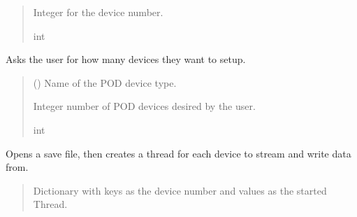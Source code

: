 \documentclass[letterpaper,10pt,english]{sphinxmanual}
\begin{document}
\begin{fulllineitems}
\begin{fulllineitems}
\begin{quote}
\begin{description}
\sphinxAtStartPar
Integer for the device number.

\sphinxAtStartPar
int

\end{description}\end{quote}

\end{fulllineitems}


\begin{fulllineitems}
\label{\detokenize{Setup_PodInterface:Setup_PodInterface.Setup_Interface._SetNumberOfDevices}}
\pysigstartsignatures
{}
\pysigstopsignatures
\sphinxAtStartPar
Asks the user for how many devices they want to setup.
\begin{quote}\begin{description}
\sphinxAtStartPar
{} () \textendash{} Name of the POD device type.

\sphinxAtStartPar
Integer number of POD devices desired by the user.

\sphinxAtStartPar
int

\end{description}\end{quote}

\end{fulllineitems}


\begin{fulllineitems}
\label{\detokenize{Setup_PodInterface:Setup_PodInterface.Setup_Interface._StreamThreading}}
\pysigstartsignatures
{}
\pysigstopsignatures
\sphinxAtStartPar
Opens a save file, then creates a thread for each device to stream and write data from.
\begin{quote}\begin{description}
\sphinxAtStartPar
Dictionary with keys as the device number and values as the started Thread.


\end{description}
\end{quote}
\end{fulllineitems}
\end{fulllineitems}
\end{document}
